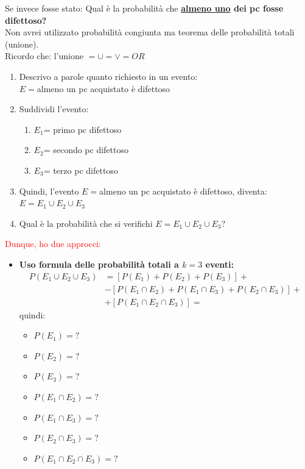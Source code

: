 \documentclass{article}  %
\theoremstyle{definition}
\begin{document}
\begin{esercizio}[Esercizio]
	Se invece fosse stato: Qual è la probabilità che \textbf{\underline{almeno uno} dei pc fosse difettoso?} \\Non avrei utilizzato probabilità congiunta
	ma teorema delle probabilità totali (unione). \\ Ricordo che: l'unione $=\cup = \lor = OR$
	\begin{enumerate}
		\item Descrivo a parole quanto richiesto in un evento: \\ $E=$almeno un pc acquistato è difettoso
		\item Suddividi l'evento:
		      \begin{enumerate}
			      \item $E_1$= primo pc difettoso
			      \item $E_2$= secondo pc difettoso
			      \item $E_3$= terzo pc difettoso
		      \end{enumerate}
		\item Quindi, l'evento $E=$almeno un pc acquistato è difettoso, diventa: \\ $E=E_1 \cup E_2 \cup E_3$
		\item Qual è la probabilità che si verifichi $E=E_1 \cup E_2 \cup E_3$?
	\end{enumerate}
	\textcolor{red}{Dunque, ho due approcci:}
	\begin{itemize}
		\item \textbf{Uso formula delle probabilità totali a $k=3$ eventi:}
		      \begin{align*}
			      P(E_1 \cup E_2 \cup E_3)
			       & = [P(E_1) + P(E_2) + P(E_3)] +                        \\
			       & - [P(E_1 \cap E_2)+P(E_1 \cap E_3)+P(E_2 \cap E_3)] + \\
			       & + [P(E_1 \cap E_2 \cap E_3)] =
		      \end{align*}
		      quindi:
		      \begin{itemize}
			      \item $P(E_1)=?$
			      \item $P(E_2)=?$
			      \item $P(E_3)=?$
			      \item $P(E_1 \cap E_2)=?$
			      \item $P(E_1 \cap E_3)=?$
			      \item $P(E_2 \cap E_3)=?$
			      \item $P(E_1 \cap E_2 \cap E_3)=?$

\end{itemize}
\end{itemize}
\end{esercizio}
\end{document}
